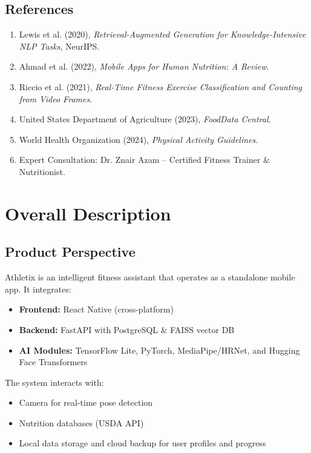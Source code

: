 \documentclass[12pt,a4paper]{article}
\begin{document}
\subsection{References}
\begin{enumerate}[leftmargin=*]
    \item Lewis et al. (2020), \textit{Retrieval-Augmented Generation for Knowledge-Intensive NLP Tasks}, NeurIPS.
    \item Ahmad et al. (2022), \textit{Mobile Apps for Human Nutrition: A Review}.
    \item Riccio et al. (2021), \textit{Real-Time Fitness Exercise Classification and Counting from Video Frames}.
    \item United States Department of Agriculture (2023), \textit{FoodData Central}.
    \item World Health Organization (2024), \textit{Physical Activity Guidelines}.
    \item Expert Consultation: Dr. Znair Azam – Certified Fitness Trainer \& Nutritionist.
\end{enumerate}

\newpage
\section{Overall Description}

\subsection{Product Perspective}
Athletix is an intelligent fitness assistant that operates as a standalone mobile app. It integrates:

\begin{itemize}[leftmargin=*]
    \item \textbf{Frontend:} React Native (cross-platform)
    \item \textbf{Backend:} FastAPI with PostgreSQL \& FAISS vector DB
    \item \textbf{AI Modules:} TensorFlow Lite, PyTorch, MediaPipe/HRNet, and Hugging Face Transformers
\end{itemize}

The system interacts with:
\begin{itemize}[leftmargin=*]
    \item Camera for real-time pose detection
    \item Nutrition databases (USDA API)
    \item Local data storage and cloud backup for user profiles and progress
\end{itemize}
\end{document}
